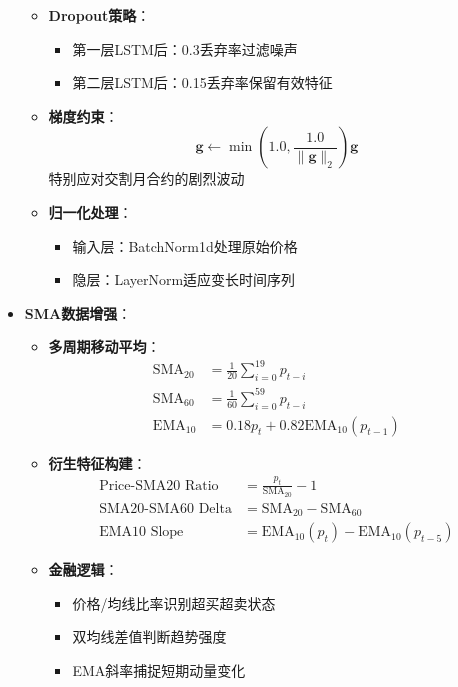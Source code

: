 \documentclass[a4paper,11pt]{ctexart}
\begin{document}
\begin{itemize}
\begin{itemize}
  \item \textbf{Dropout策略}：
    \begin{itemize}
    \item 第一层LSTM后：0.3丢弃率过滤噪声
    \item 第二层LSTM后：0.15丢弃率保留有效特征
    \end{itemize}
  
  \item \textbf{梯度约束}：
    \[
    \mathbf{g} \leftarrow \min\left(1.0, \frac{1.0}{\|\mathbf{g}\|_2}\right)\mathbf{g}
    \]
    特别应对交割月合约的剧烈波动
  
  \item \textbf{归一化处理}：
    \begin{itemize}
    \item 输入层：BatchNorm1d处理原始价格
    \item 隐层：LayerNorm适应变长时间序列
    \end{itemize}
  \end{itemize}
  
  
  \item \textbf{SMA数据增强}：
    \begin{itemize}
    \item \textbf{多周期移动平均}：
      \begin{align*}
      \text{SMA}_{20} &= \frac{1}{20}\sum_{i=0}^{19} p_{t-i} \\
      \text{SMA}_{60} &= \frac{1}{60}\sum_{i=0}^{59} p_{t-i} \\
      \text{EMA}_{10} &= 0.18p_t + 0.82\text{EMA}_{10}(p_{t-1})
      \end{align*}
      
    \item \textbf{衍生特征构建}：
      \begin{equation*}
      \begin{aligned}
      \text{Price-SMA20 Ratio} &= \frac{p_t}{\text{SMA}_{20}} - 1 \\
      \text{SMA20-SMA60 Delta} &= \text{SMA}_{20} - \text{SMA}_{60} \\
      \text{EMA10 Slope} &= \text{EMA}_{10}(p_t) - \text{EMA}_{10}(p_{t-5})
      \end{aligned}
      \end{equation*}
      
    \item \textbf{金融逻辑}：
      \begin{itemize}
      \item 价格/均线比率识别超买超卖状态
      \item 双均线差值判断趋势强度
      \item EMA斜率捕捉短期动量变化
      \end{itemize}
    \end{itemize}
  \end{itemize}
  
\end{document}
